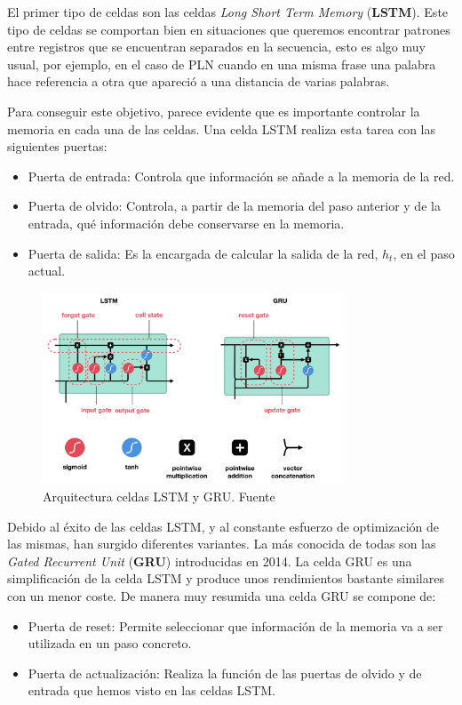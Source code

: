 El primer tipo de celdas  son las celdas \textit{Long Short Term Memory} (\textbf{LSTM}). Este tipo de celdas se comportan bien en situaciones que queremos encontrar patrones entre registros que se encuentran separados en la secuencia, esto es algo muy usual, por ejemplo, en el caso de PLN cuando en una misma frase una palabra hace referencia a otra que apareció a una distancia de varias palabras. 
	
Para conseguir este objetivo, parece evidente que es importante controlar la memoria en cada una de las celdas. Una celda LSTM realiza esta tarea con las siguientes puertas: 
	\begin{itemize}
		\item Puerta de entrada: Controla que información se añade a la memoria de la red. 
		\item Puerta de olvido: Controla, a partir de la memoria del paso anterior y de la entrada, qué información debe conservarse en la memoria. 
		\item Puerta de salida:  Es la encargada de calcular la salida de la red, $h_{t}$, en el paso actual. 
	\end{itemize}

\begin{figure}[!ht]
	\centering
	\includegraphics[width=0.8\textwidth]{images/arte/lstmvsgru}
	\caption{Arquitectura celdas LSTM y GRU. Fuente \cite{lstmgru}}
	\label{fig:lstmvsgru}
\end{figure}



Debido al éxito de las celdas LSTM, y al constante esfuerzo de optimización de las mismas, han surgido diferentes variantes. La más conocida de todas son las \textit{Gated Recurrent Unit} (\textbf{GRU}) introducidas en 2014. La celda GRU es una simplificación de la celda LSTM y produce unos rendimientos bastante similares con un menor coste. De manera muy resumida una celda GRU se compone de: 
\begin{itemize}
	\item Puerta de reset: Permite seleccionar que información de la memoria va a ser utilizada en un paso concreto. 
	\item Puerta de actualización: Realiza la función de las puertas de olvido y de entrada que hemos visto en las celdas LSTM.
\end{itemize}

